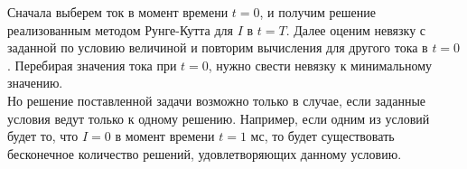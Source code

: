 \begin{enumerate}
Сначала выберем ток в момент времени $t = 0$, и получим решение реализованным методом Рунге-Кутта для $I$ в $t = T$. Далее оценим невязку с заданной по условию величиной и повторим вычисления для другого тока в $t = 0$. Перебирая значения тока при $t = 0$, нужно свести невязку к минимальному значению. \\

Но решение поставленной задачи возможно только в случае, если заданные условия ведут только к одному решению. Например, если одним из условий будет то, что $I = 0$ в момент времени $t = 1$ мс, то будет существовать бесконечное количество решений, удовлетворяющих данному условию.
\end{enumerate}